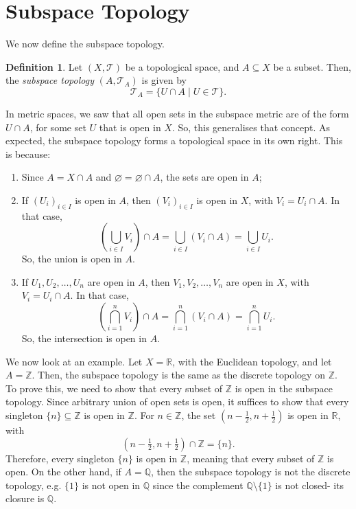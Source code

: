 \documentclass[a4paper, openany]{memoir}
\theoremstyle{definition}
\newtheorem{definition}{Definition}[section]
\theoremstyle{plain}
\begin{document}
\section{Subspace Topology}
We now define the subspace topology.
\begin{definition}
Let $(X, \mathcal{T})$ be a topological space, and $A \subseteq X$ be a subset. Then, the \emph{subspace topology} $(A, \mathcal{T}_A)$ is given by
\[\mathcal{T}_A = \{U \cap A \mid U \in \mathcal{T}\}.\]
\end{definition}
\noindent In metric spaces, we saw that all open sets in the subspace metric are of the form $U \cap A$, for some set $U$ that is open in $X$. So, this generalises that concept. As expected, the subspace topology forms a topological space in its own right. This is because:
\begin{enumerate}[label=\textbf{T\arabic*}.]
    \item Since $A = X \cap A$ and $\varnothing = \varnothing \cap A$, the sets are open in $A$;
    \item If $(U_i)_{i \in I}$ is open in $A$, then $(V_i)_{i \in I}$ is open in $X$, with $V_i = U_i \cap A$. In that case,
    \[\left(\bigcup_{i \in I} V_i \right) \cap A = \bigcup_{i \in I} (V_i \cap A) = \bigcup_{i \in I} U_i.\]
    So, the union is open in $A$.
    \item If $U_1, U_2, \dots, U_n$ are open in $A$, then $V_1, V_2, \dots, V_n$ are open in $X$, with $V_i = U_i \cap A$. In that case,
    \[\left(\bigcap_{i = 1}^n V_i \right) \cap A = \bigcap_{i=1}^n (V_i \cap A) = \bigcap_{i=1}^n U_i.\]
    So, the intersection is open in $A$.
\end{enumerate}

We now look at an example. Let $X = \mathbb{R}$, with the Euclidean topology, and let $A = \mathbb{Z}$. Then, the subspace topology is the same as the discrete topology on $\mathbb{Z}$. To prove this, we need to show that every subset of $\mathbb{Z}$ is open in the subspace topology. Since arbitrary union of open sets is open, it suffices to show that every singleton $\{n\} \subseteq \mathbb{Z}$ is open in $\mathbb{Z}$. For $n \in \mathbb{Z}$, the set $(n - \frac{1}{2}, n + \frac{1}{2})$ is open in $\mathbb{R}$, with 
\[(n - \tfrac{1}{2}, n + \tfrac{1}{2}) \cap \mathbb{Z} = \{n\}.\]
Therefore, every singleton $\{n\}$ is open in $\mathbb{Z}$, meaning that every subset of $\mathbb{Z}$ is open. On the other hand, if $A = \mathbb{Q}$, then the subspace topology is not the discrete topology, e.g. $\{1\}$ is not open in $\mathbb{Q}$ since the complement $\mathbb{Q} \setminus \{1\}$ is not closed- its closure is $\mathbb{Q}$.
\end{document}
